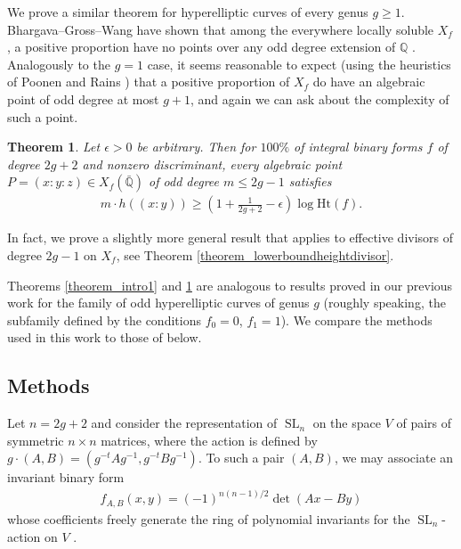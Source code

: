 \documentclass{article} %
\newtheorem{theorem}[proposition]{Theorem}
\numberwithin{equation}{section}
\DeclareMathOperator{\SL}{SL}
\newcommand{\Q}{\mathbb{Q}}
\newcommand{\height}{\mathrm{Ht}}
\begin{document}
We prove a similar theorem for hyperelliptic curves of every genus $g\geq 1$.
Bhargava--Gross--Wang have shown that among the everywhere locally soluble $X_f$, a positive proportion have no points over any odd degree extension of $\Q$ \cite{BGW17}.
Analogously to the $g=1$ case, it seems reasonable to expect (using the heuristics of Poonen and Rains \cite{PoonenRainsRandom}) that a positive proportion of $X_f$ do have an algebraic point of odd degree at most $g+1$, and again we can ask about the complexity of such a point.



\begin{theorem}\label{theorem_intro2}
    Let $\epsilon >0$ be arbitrary.
    Then for $100\%$ of integral binary forms $f$ of degree $2g+2$ and nonzero discriminant, every algebraic point $P  = (x:y:z) \in X_f(\bar{\Q})$ of odd degree $m\leq 2g-1$ satisfies
    \begin{align}
        m\cdot  h((x:y)) \geq \left( 1+ \frac{1}{2g+2} - \epsilon \right) \log \height(f).
    \end{align}
\end{theorem}

In fact, we prove a slightly more general result that applies to effective divisors of degree $2g-1$ on $X_f$, see Theorem \ref{theorem_lowerboundheightdivisor}. 

Theorems \ref{theorem_intro1} and \ref{theorem_intro2} are analogous to results proved in our previous work \cite{lagathorne2024smallheightoddhyperelliptic} for the family of odd hyperelliptic curves of genus $g$ (roughly speaking, the subfamily defined by the conditions $f_0 = 0$, $f_1 = 1$). We compare the methods used in this work to those of \cite{lagathorne2024smallheightoddhyperelliptic} below. 


\subsection{Methods}
Let $n=2g+2$ and consider the representation of $\SL_n$ on the space $V$ of pairs of symmetric $n\times n$ matrices, where the action is defined by $g\cdot (A,B) = (g^{-t}Ag^{-1},g^{-t}Bg^{-1})$.
To such a pair $(A,B)$, we may associate an invariant binary form 
\begin{align*}
    f_{A,B}(x,y) = (-1)^{n(n-1)/2}\det(Ax -By)
\end{align*}
whose coefficients freely generate the ring of polynomial invariants for the $\SL_n$-action on $V$ \cite{BGW17}.
\end{document}
